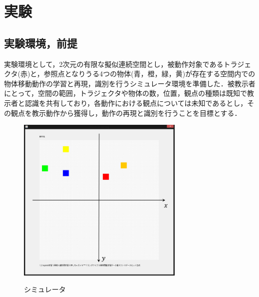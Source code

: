 ﻿%
\chapter{実験}

\section{実験環境，前提}

実験環境として，2次元の有限な擬似連続空間とし，被動作対象であるトラジェクタ(赤)と，参照点となりうる4つの物体(青，橙，緑，黄)が存在する空間内での物体移動動作の学習と再現，識別を行うシミュレータ環境を準備した．被教示者にとって，空間の範囲，トラジェクタや物体の数，位置，観点の種類は既知で教示者と認識を共有しており，各動作における観点については未知であるとし，その観点を教示動作から獲得し，動作の再現と識別を行うことを目標とする．
	\begin{figure}[b]
		\begin{center}
			\includegraphics[width=8cm]{figure3.png} \\ %
			\caption{シミュレータ}
		\end{center}
	\end{figure}

